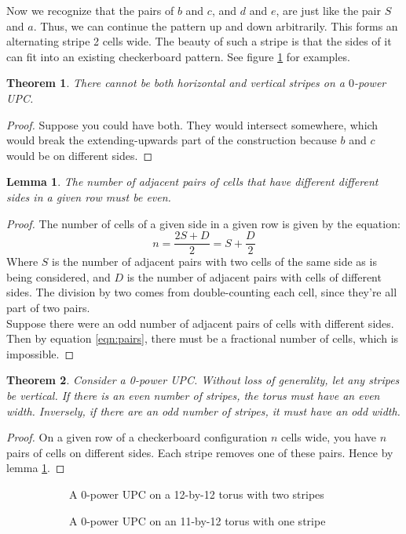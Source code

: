 \documentclass[12pt]{article}
\newtheorem{theorem}{Theorem}%
\newtheorem{lemma}{Lemma}%
\theoremstyle{definition}
\theoremstyle{remark}
\theoremstyle{remark}
\begin{document}
Now we recognize that the pairs of $b$ and $c$, and $d$ and $e$, are just like the pair $S$ and $a$. Thus, we can continue the pattern up and down arbitrarily. This forms an alternating stripe 2 cells wide. The beauty of such a stripe is that the sides of it can fit into an existing checkerboard pattern. See figure \ref{0PowStripes} for examples.
\begin{theorem}
There cannot be both horizontal and vertical stripes on a $0$-power UPC.
\end{theorem}
\begin{proof}
Suppose you could have both. They would intersect somewhere, which would break the extending-upwards part of the construction because $b$ and $c$ would be on different sides.
\end{proof}
\begin{lemma}
\label{pairsLemma}
The number of adjacent pairs of cells that have different different sides in a given row must be even.
\end{lemma}
\begin{proof}
The number of cells of a given side in a given row is given by the equation:
\begin{equation}
  \label{eqn:pairs}
  n = \frac{2S+D}{2}=S+\frac{D}{2}
\end{equation}
Where $S$ is the number of adjacent pairs with two cells of the same side as is being considered, and $D$ is the number of adjacent pairs with cells of different sides. The division by two comes from double-counting each cell, since they're all part of two pairs. \\
Suppose there were an odd number of adjacent pairs of cells with different sides. Then by equation \ref{eqn:pairs}, there must be a fractional number of cells, which is impossible.
\end{proof}
\begin{theorem}
Consider a 0-power UPC. Without loss of generality, let any stripes be vertical. If there is an even number of stripes, the torus must have an even width. Inversely, if there are an odd number of stripes, it must have an odd width.
\end{theorem}
\begin{proof}
On a given row of a checkerboard configuration $n$ cells wide, you have $n$ pairs of cells on different sides. Each stripe removes one of these pairs. Hence by lemma \ref{pairsLemma}. %
\end{proof}

\begin{figure}
  \centering
  \begin{subfigure}[b]{\linewidth}
    \centering
    \caption{A $0$-power UPC on a 12-by-12 torus with two stripes}
  \end{subfigure}
  \begin{subfigure}[b]{\linewidth}
    \centering
    \caption{A $0$-power UPC on an 11-by-12 torus with one stripe}  
  \end{subfigure}
  \caption{}
  \label{0PowStripes}
\end{figure}
\end{document}
